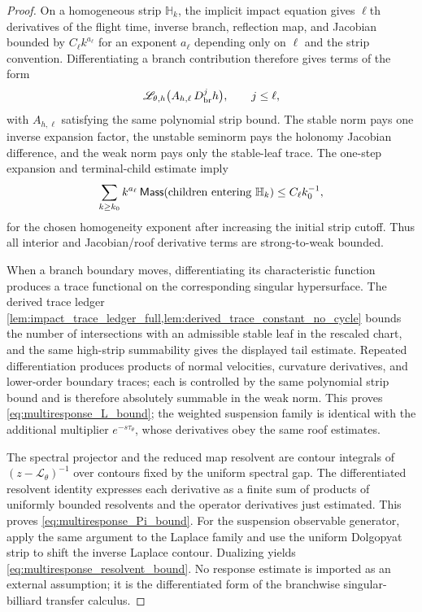 \documentclass[12pt, letterpaper]{amsart}
\providecommand{\Ltransfer}{\mathscr{L}}
\newcommand{\Mass}{\mathsf{Mass}}
\theoremstyle{plain}
\theoremstyle{definition}
\theoremstyle{remark}
\begin{document}
\begin{proof}
On a homogeneous strip $\mathbb H_k$, the implicit impact equation gives
$\ell$th derivatives of the flight time, inverse branch, reflection map, and
Jacobian bounded by $C_\ell k^{a_\ell}$ for an exponent $a_\ell$ depending only
on $\ell$ and the strip convention.  Differentiating a branch contribution
therefore gives terms of the form
\begin{equation}
    \Ltransfer_{\theta,h}\big(A_{h,\ell}\,D_{\rm br}^{j}h\big),
    \qquad j\le \ell,
\end{equation}
with $A_{h,\ell}$ satisfying the same polynomial strip bound.  The stable norm
pays one inverse expansion factor, the unstable seminorm pays the holonomy
Jacobian difference, and the weak norm pays only the stable-leaf trace.  The
one-step expansion and terminal-child estimate imply
\begin{equation}
    \sum_{k\ge k_0} k^{a_\ell}\,\Mass(\hbox{children entering }\mathbb H_k)
       \le C_\ell k_0^{-1},
\end{equation}
for the chosen homogeneity exponent after increasing the initial strip cutoff.
Thus all interior and Jacobian/roof derivative terms are strong-to-weak
bounded.

When a branch boundary moves, differentiating its characteristic function
produces a trace functional on the corresponding singular hypersurface.  The
derived trace ledger \cref{lem:impact_trace_ledger_full,lem:derived_trace_constant_no_cycle} bounds the
number of intersections with an admissible stable leaf in the rescaled chart,
and the same high-strip summability gives the displayed tail estimate.  Repeated
differentiation produces products of normal velocities, curvature derivatives,
and lower-order boundary traces; each is controlled by the same polynomial
strip bound and is therefore absolutely summable in the weak norm.  This proves
\eqref{eq:multiresponse_L_bound}; the weighted suspension family is identical
with the additional multiplier $e^{-s\tau_\theta}$, whose derivatives obey the
same roof estimates.

The spectral projector and the reduced map resolvent are contour integrals of
$(z-\Ltransfer_\theta)^{-1}$ over contours fixed by the uniform spectral gap.
The differentiated resolvent identity expresses each derivative as a finite sum
of products of uniformly bounded resolvents and the operator derivatives just
estimated.  This proves \eqref{eq:multiresponse_Pi_bound}.  For the suspension
observable generator, apply the same argument to the Laplace family and use the
uniform Dolgopyat strip to shift the inverse Laplace contour.  Dualizing yields
\eqref{eq:multiresponse_resolvent_bound}.  No response estimate is imported as
an external assumption; it is the differentiated form of the branchwise
singular-billiard transfer calculus.
\end{proof}
\end{document}
